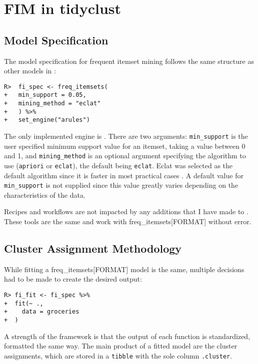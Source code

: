 \documentclass[
  article]{jss}
\begin{document}
\section{FIM in tidyclust}\label{sec-implementation}

\subsection{Model Specification}\label{model-specification}

The model specification for frequent itemset mining follows the same
structure as other models in :

\begin{verbatim}
R>  fi_spec <- freq_itemsets(
+   min_support = 0.05, 
+   mining_method = "eclat"
+   ) %>%
+   set_engine("arules")
\end{verbatim}

The only implemented engine is . There are two arguments:
\texttt{min\_support} is the user specified minimum support value for an
itemset, taking a value between 0 and 1, and \texttt{mining\_method} is
an optional argument specifying the algorithm to use (\texttt{apriori}
or \texttt{eclat}), the default being \texttt{eclat}. Eclat was selected
as the default algorithm since it is faster in most practical cases
\citep{singla_comprehensive_2023}. A default value for
\texttt{min\_support} is not supplied since this value greatly varies
depending on the characteristics of the data.

Recipes and workflows are not impacted by any additions that I have made
to . These tools are the same and work with
freq\_itemsets{[}FORMAT{]} without error.

\subsection{Cluster Assignment
Methodology}\label{cluster-assignment-methodology}

While fitting a freq\_itemsets{[}FORMAT{]} model is the same, multiple
decisions had to be made to create the desired output:

\begin{verbatim}
R> fi_fit <- fi_spec %>%
+  fit(~ .,
+    data = groceries
+  )
\end{verbatim}

A strength of the  framework is that the output of each
function is standardized, formatted the same way. The main product of a
fitted model are the cluster assignments, which are stored in a
\texttt{tibble} with the sole column \texttt{.cluster}.
\end{document}
